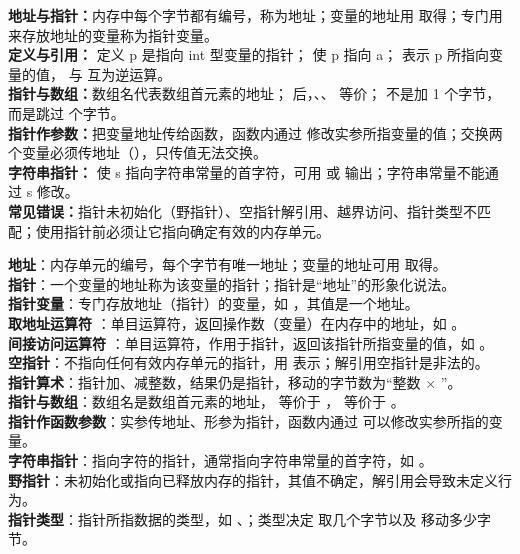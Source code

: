 \documentclass[a4paper,11pt]{article}
\begin{document}

\begin{knowmap}
\textbf{地址与指针：}内存中每个字节都有编号，称为地址；变量的地址用 \code{\&} 取得；专门用来存放地址的变量称为指针变量。\\[2pt]
\textbf{定义与引用：} 定义 p 是指向 int 型变量的指针； 使 p 指向 a； 表示 p 所指向变量的值，\code{\&} 与 \code{*} 互为逆运算。\\[2pt]
\textbf{指针与数组：}数组名代表数组首元素的地址； 后，、、 等价； 不是加 1 个字节，而是跳过  个字节。\\[2pt]
\textbf{指针作参数：}把变量地址传给函数，函数内通过  修改实参所指变量的值；交换两个变量必须传地址（），只传值无法交换。\\[2pt]
\textbf{字符串指针：} 使 s 指向字符串常量的首字符，可用  或  输出；字符串常量不能通过 s 修改。\\[2pt]
\textbf{常见错误：}指针未初始化（野指针）、空指针解引用、越界访问、指针类型不匹配；使用指针前必须让它指向确定有效的内存单元。
\end{knowmap}

\begin{keyterms}
\textbf{地址}：内存单元的编号，每个字节有唯一地址；变量的地址可用 \code{\&} 取得。\\
\textbf{指针}：一个变量的地址称为该变量的指针；指针是“地址”的形象化说法。\\
\textbf{指针变量}：专门存放地址（指针）的变量，如 ，其值是一个地址。\\
\textbf{取地址运算符 \code{\&}}：单目运算符，返回操作数（变量）在内存中的地址，如 。\\
\textbf{间接访问运算符 \code{*}}：单目运算符，作用于指针，返回该指针所指变量的值，如 。\\
\textbf{空指针}：不指向任何有效内存单元的指针，用  表示；解引用空指针是非法的。\\
\textbf{指针算术}：指针加、减整数，结果仍是指针，移动的字节数为“整数 $\times$ ”。\\
\textbf{指针与数组}：数组名是数组首元素的地址， 等价于 ， 等价于 。\\
\textbf{指针作函数参数}：实参传地址、形参为指针，函数内通过  可以修改实参所指的变量。\\
\textbf{字符串指针}：指向字符的指针，通常指向字符串常量的首字符，如 。\\
\textbf{野指针}：未初始化或指向已释放内存的指针，其值不确定，解引用会导致未定义行为。\\
\textbf{指针类型}：指针所指数据的类型，如 、；类型决定  取几个字节以及  移动多少字节。
\end{keyterms}
\end{document}
